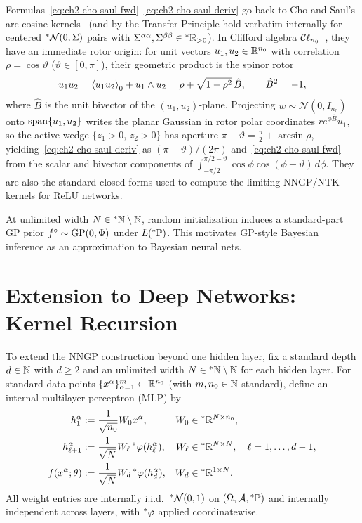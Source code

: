 \begin{remark}\label{rem:ch2-cho-saul}
Formulas~\eqref{eq:ch2-cho-saul-fwd}--\eqref{eq:ch2-cho-saul-deriv} go back to Cho and Saul's arc-cosine kernels~\cite{cho2009kernel} (and by the Transfer Principle hold verbatim internally for centered ${}^*\mathcal{N}(0, \Sigma)$ pairs with $\Sigma^{\alpha\alpha}, \Sigma^{\beta\beta} \in {}^*\mathbb{R}_{>0}$). In Clifford algebra $\mathcal{C}\ell_{n_0}$~\cite{hestenes1984clifford,doran2003geometric}, they have an immediate rotor origin: for unit vectors $u_1, u_2 \in \mathbb{R}^{n_0}$ with correlation $\rho = \cos\vartheta$ ($\vartheta \in [0, \pi]$), their geometric product is the spinor rotor
\[
u_1 u_2 = \left\langle u_1 u_2 \right\rangle_0 + u_1 \wedge u_2 = \rho + \sqrt{1 - \rho^2}\,\hat{B}, \qquad \hat{B}^2 = -1,
\]
where $\hat{B}$ is the unit bivector of the $(u_1, u_2)$-plane. Projecting $w \sim \mathcal{N}(0, I_{n_0})$ onto $\operatorname{span}\{u_1, u_2\}$ writes the planar Gaussian in rotor polar coordinates $r e^{\phi\hat{B}} u_1$, so the active wedge $\{z_1 > 0,\, z_2 > 0\}$ has aperture $\pi - \vartheta = \frac{\pi}{2} + \arcsin\rho$, yielding~\eqref{eq:ch2-cho-saul-deriv} as $(\pi - \vartheta)/(2\pi)$ and~\eqref{eq:ch2-cho-saul-fwd} from the scalar and bivector components of $\int_{-\pi/2}^{\pi/2-\vartheta} \cos\phi\cos(\phi+\vartheta)\,d\phi$. They are also the standard closed forms used to compute the limiting NNGP/NTK kernels for ReLU networks.
\end{remark}

\begin{remark}\label{rem:ch2-bayesian}
At unlimited width $N \in {}^*\mathbb{N} \setminus \mathbb{N}$, random initialization induces a standard-part GP prior $f^\circ \sim \operatorname{GP}(0, \Phi)$ under $L({}^*\mathbb{P})$. This motivates GP-style Bayesian inference as an approximation to Bayesian neural nets.
\end{remark}

\section{Extension to Deep Networks: Kernel Recursion}\label{sec:ch2-deep-nngp}

To extend the NNGP construction beyond one hidden layer, fix a standard depth $d \in \mathbb{N}$ with $d \ge 2$ and an unlimited width $N \in {}^*\mathbb{N} \setminus \mathbb{N}$ for each hidden layer. For standard data points $\{x^\alpha\}_{\alpha=1}^{m} \subset \mathbb{R}^{n_0}$ (with $m, n_0 \in \mathbb{N}$ standard), define an internal multilayer perceptron (MLP) by
\begin{align}
h_1^\alpha &:= \frac{1}{\sqrt{n_0}} W_0 x^\alpha, & W_0 &\in {}^*\mathbb{R}^{N \times n_0}, \label{eq:ch2-mlp-h1} \\
h_{\ell+1}^\alpha &:= \frac{1}{\sqrt{N}} W_\ell \, {}^*\varphi(h_\ell^\alpha), & W_\ell &\in {}^*\mathbb{R}^{N \times N}, \quad \ell = 1, \dots, d-1, \label{eq:ch2-mlp-hell} \\
f(x^\alpha; \theta) &:= \frac{1}{\sqrt{N}} W_d \, {}^*\varphi(h_d^\alpha), & W_d &\in {}^*\mathbb{R}^{1 \times N}. \label{eq:ch2-mlp-out}
\end{align}
All weight entries are internally i.i.d.\ ${}^*\mathcal{N}(0, 1)$ on $(\Omega, \mathcal{A}, {}^*\mathbb{P})$ and internally independent across layers, with ${}^*\varphi$ applied coordinatewise.

